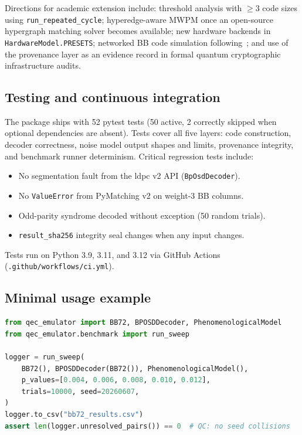 \documentclass[11pt,a4paper]{article}
\begin{document}
Directions for academic extension include:
threshold analysis with $\ge3$ code sizes using \texttt{run\_repeated\_cycle};
hyperedge-aware MWPM once an open-source hypergraph matching solver
becomes available;
new hardware backends in \texttt{HardwareModel.PRESETS};
networked BB code simulation following~\cite{ShawRengaswamy2026};
and use of the provenance layer as an evidence record in formal
quantum cryptographic infrastructure audits.

\subsection{Testing and continuous integration}

The package ships with 52 pytest tests (50 active, 2 correctly skipped
when optional dependencies are absent).
Tests cover all five layers: code construction, decoder correctness,
noise model output shapes and limits, provenance integrity, and
benchmark runner determinism.
Critical regression tests include:
\begin{itemize}[leftmargin=1.6em,itemsep=0pt]
  \item No segmentation fault from the ldpc v2 API (\texttt{BpOsdDecoder}).
  \item No \texttt{ValueError} from PyMatching v2 on weight-3 BB columns.
  \item Odd-parity syndrome decoded without exception (50 random trials).
  \item \texttt{result\_sha256} integrity seal changes when any input changes.
\end{itemize}
Tests run on Python 3.9, 3.11, and 3.12 via GitHub Actions
(\texttt{.github/workflows/ci.yml}).

\subsection{Minimal usage example}
\label{ssec:emulator-usage}

\begin{lstlisting}[language=Python,caption={Single-round sweep with
  provenance logging (QEC Emulator v1.2.4).}]
from qec_emulator import BB72, BPOSDDecoder, PhenomenologicalModel
from qec_emulator.benchmark import run_sweep

logger = run_sweep(
    BB72(), BPOSDDecoder(BB72()), PhenomenologicalModel(),
    p_values=[0.004, 0.006, 0.008, 0.010, 0.012],
    trials=10000, seed=20260607,
)
logger.to_csv("bb72_results.csv")
assert len(logger.unresolved_pairs()) == 0  # QC: no seed collisions
\end{lstlisting}
\end{document}
